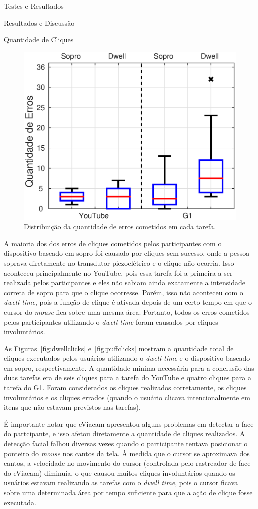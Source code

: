 \begin{chapter}{Testes e Resultados}
\begin{section}{Resultados e Discussão}
\begin{subsection}{Quantidade de Cliques}
\begin{figure}[!h]
	\centering
	\includegraphics[width=.7\linewidth]{fig/erros}
	\caption{Distribuição da quantidade de erros cometidos em cada tarefa.}
	\label{fig:cliques}
\end{figure}

A maioria dos dos erros de cliques cometidos pelos participantes com o
dispositivo baseado em sopro foi causado por cliques sem sucesso, onde a pessoa
soprava diretamente no transdutor piezoelétrico e o clique não ocorria. Isso
aconteceu principalmente no YouTube, pois essa tarefa foi a primeira a ser
realizada pelos participantes e eles não sabiam ainda exatamente a intensidade
correta de sopro para que o clique ocorresse. Porém, isso não aconteceu com o
\textit{dwell time}, pois a função de clique é ativada depois de um certo
tempo em que o cursor do \textit{mouse} fica sobre uma mesma área. Portanto,
todos os erros cometidos pelos participantes utilizando o \textit{dwell time}
foram causados por cliques involuntários.

As Figuras~\ref{fig:dwellclicks} e~\ref{fig:puffclicks} mostram a quantidade
total de cliques executados pelos usuários utilizando o \textit{dwell time} e o
dispositivo baseado em sopro, respectivamente. A quantidade mínima necessária
para a conclusão das duas tarefas era de seis cliques para a tarefa do YouTube e
quatro cliques para a tarefa do G1. Foram considerados os cliques
realizados corretamente, os cliques involuntários e os
cliques errados (quando o usuário clicava intencionalmente em itens que não
estavam previstos nas tarefas).

É importante notar que eViacam apresentou alguns problemas em detectar a face do
partcipante, e isso afetou diretamente a quantidade de cliques realizados. A
detecção facial falhou diversas vezes quando o participante tentava posicionar o
ponteiro do \textit{mouse} nos cantos da tela. À medida que o cursor se
aproximava dos cantos, a velocidade no movimento do cursor (controlada pelo
rastreador de face do eViacam) diminuía, o que causou muitos cliques
involuntários quando os usuários estavam realizando as tarefas com o
\textit{dwell time}, pois o cursor ficava sobre uma determinada área por
tempo suficiente para que a ação de clique fosse executada.


\end{subsection}
\end{section}
\end{chapter}
